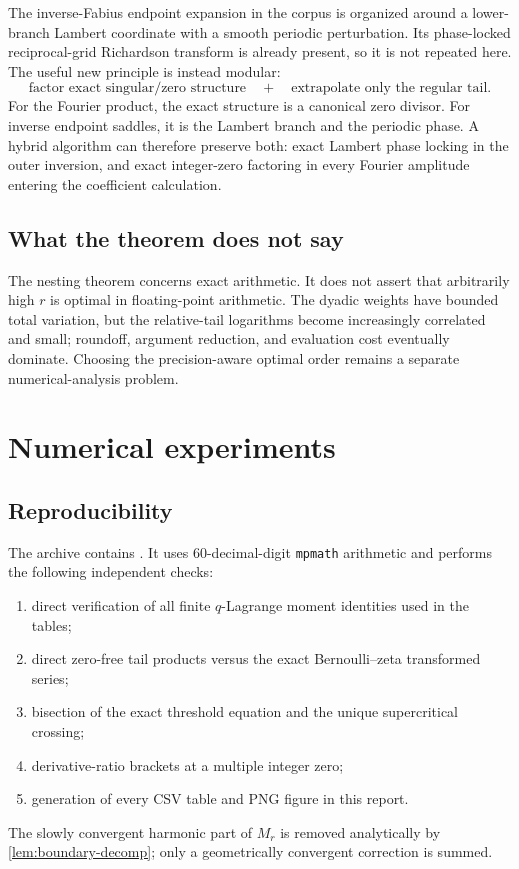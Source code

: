\documentclass[11pt,oneside]{article}
\numberwithin{equation}{section}
\theoremstyle{frontier}
\theoremstyle{definition}
\theoremstyle{remark}
\begin{document}
The inverse-Fabius endpoint expansion in the corpus is organized around a lower-branch
Lambert coordinate with a smooth periodic perturbation.  Its phase-locked reciprocal-grid
Richardson transform is already present, so it is not repeated here.  The useful new
principle is instead modular:
\begin{equation}
 \text{factor exact singular/zero structure}\quad+\quad
 \text{extrapolate only the regular tail}.
 \label{eq:modular-principle}
\end{equation}
For the Fourier product, the exact structure is a canonical zero divisor.  For inverse
endpoint saddles, it is the Lambert branch and the periodic phase.  A hybrid algorithm can
therefore preserve both: exact Lambert phase locking in the outer inversion, and exact
integer-zero factoring in every Fourier amplitude entering the coefficient calculation.

\subsection{What the theorem does not say}

The nesting theorem concerns exact arithmetic.  It does not assert that arbitrarily high
$r$ is optimal in floating-point arithmetic.  The dyadic weights have bounded total
variation, but the relative-tail logarithms become increasingly correlated and small;
roundoff, argument reduction, and evaluation cost eventually dominate.  Choosing the
precision-aware optimal order remains a separate numerical-analysis problem.

\section{Numerical experiments}\label{sec:numerics}

\subsection{Reproducibility}

The archive contains .  It uses 60-decimal-digit
\texttt{mpmath} arithmetic and performs the following independent checks:
\begin{enumerate}
\item direct verification of all finite $q$-Lagrange moment identities used in the tables;
\item direct zero-free tail products versus the exact Bernoulli--zeta transformed series;
\item bisection of the exact threshold equation and the unique supercritical crossing;
\item derivative-ratio brackets at a multiple integer zero;
\item generation of every CSV table and PNG figure in this report.
\end{enumerate}
The slowly convergent harmonic part of $M_r$ is removed analytically by
\cref{lem:boundary-decomp}; only a geometrically convergent correction is summed.
\end{document}
